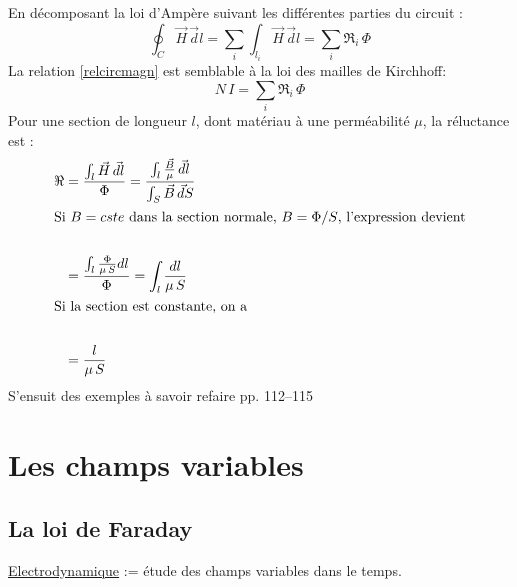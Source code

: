 \documentclass	[11pt, a4paper, openany]{book}
\begin{document}
En décomposant la loi d'Ampère suivant les différentes parties du circuit : \begin{equation}
\oint_C\vec H\,\vec dl=\sum_i\int_{l_i}\vec H\,\vec dl=\sum_i\Re_i\,\Phi
\end{equation}
La relation \eqref{relcircmagn} est semblable à la loi des mailles de Kirchhoff:\begin{equation}
N\,I=\sum_i\Re_i\,\Phi
\end{equation}
Pour une section de longueur $l$, dont matériau à une perméabilité $\mu$, la réluctance est :
\begin{align}
\Re & =\frac{\int_{l}\vec H\,\vec dl}{\Phi}=\frac{\int_{l}\frac{\vec B}{\mu}\,\vec dl}{\int_S\vec B\,\vec dS}\\
\intertext{Si $B=cste$ dans la section normale, $B=\Phi/S$, l'expression devient}\\
 & =\frac{\int_{l}\frac{\Phi}{\mu\,S}dl}{\Phi}=\int_{l}\frac{dl}{\mu\,S}\\
\intertext{Si la section est constante, on a}\\
 & =\frac{l}{\mu\,S}
\end{align}
S'ensuit des exemples à savoir refaire pp. 112--115
\chapter{Les champs variables}
\section{La loi de Faraday}
\noindent\underline{Electrodynamique} := étude des champs variables dans le temps.\\
\end{document}
